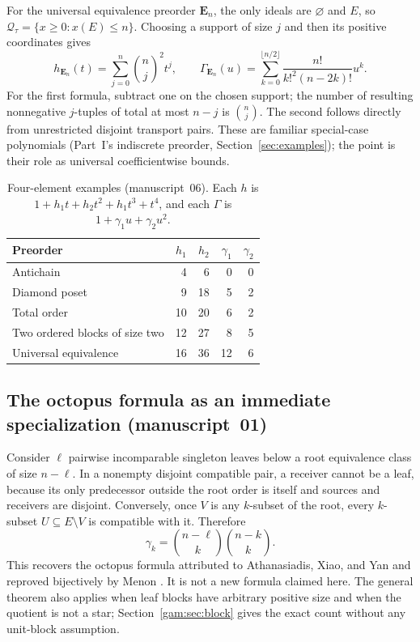 \documentclass[11pt]{article}
\numberwithin{equation}{section}
\theoremstyle{definition}
\newcommand{\Qt}{\mathcal Q_\tau}
\begin{document}
For the universal equivalence preorder $\mathbf E_n$, the only ideals are
$\varnothing$ and $E$, so $\Qt=\{x\ge0:x(E)\le n\}$. Choosing a support of
size $j$ and then its positive coordinates gives
\begin{equation}
 h_{\mathbf E_n}(t)=\sum_{j=0}^n\binom nj^2t^j,
 \qquad
 \Gamma_{\mathbf E_n}(u)=\sum_{k=0}^{\lfloor n/2\rfloor}
                 \frac{n!}{k!^2(n-2k)!}u^k.
 \label{gam:eq:universal}
\end{equation}
For the first formula, subtract one on the chosen support; the number of
resulting nonnegative $j$-tuples of total at most $n-j$ is $\binom nj$.
The second follows directly from unrestricted disjoint transport pairs.
These are familiar special-case polynomials (Part~I's indiscrete preorder,
Section~\ref{sec:examples}); the point is their role as universal
coefficientwise bounds.

\begin{table}[htbp]
\centering
\caption{Four-element examples (manuscript~06). Each $h$ is
$1+h_1t+h_2t^2+h_1t^3+t^4$, and each $\Gamma$ is $1+\gamma_1u+\gamma_2u^2$.}
\label{gam:tab:examples}
\begin{tabular}{@{}lrrrr@{}}
\toprule
Preorder & $h_1$ & $h_2$ & $\gamma_1$ & $\gamma_2$\\
\midrule
Antichain & 4 & 6 & 0 & 0\\
Diamond poset & 9 & 18 & 5 & 2\\
Total order & 10 & 20 & 6 & 2\\
Two ordered blocks of size two & 12 & 27 & 8 & 5\\
Universal equivalence & 16 & 36 & 12 & 6\\
\bottomrule
\end{tabular}
\end{table}

\subsection{The octopus formula as an immediate specialization (manuscript~01)}
Consider $\ell$ pairwise incomparable singleton leaves below a root
equivalence class of size $n-\ell$. In a nonempty disjoint compatible pair,
a receiver cannot be a leaf, because its only predecessor outside the root
order is itself and sources and receivers are disjoint. Conversely, once
$V$ is any $k$-subset of the root, every $k$-subset $U\subseteq E\setminus V$
is compatible with it. Therefore
\begin{equation}
 \gamma_k=\binom{n-\ell}k\binom{n-k}k.
 \label{gam:gv:eq:octopus}
\end{equation}
This recovers the octopus formula attributed to Athanasiadis, Xiao, and Yan
and reproved bijectively by Menon \cite[Proposition~1.1]{Menon}. It is not a
new formula claimed here. The general theorem also applies when leaf blocks
have arbitrary positive size and when the quotient is not a star;
Section~\ref{gam:sec:block} gives the exact count without any unit-block
assumption.
\end{document}
